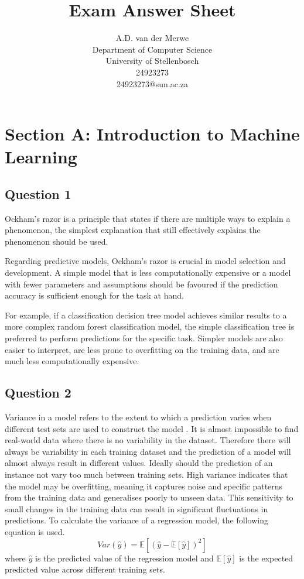 \documentclass[10pt]{article}
\title{Exam Answer Sheet}
\author{
    A.D. van der Merwe\\
    Department of Computer Science \\
    University of Stellenbosch\\
    24923273 \\
    24923273@sun.ac.za
}
\begin{document}
\maketitle

\section*{Section A: Introduction to Machine Learning}

\subsection*{Question 1}

Ockham's razor is a principle that states if there are multiple ways to explain
a phenomenon, the simplest explanation that still effectively explains the phenomenon
should be used.

Regarding predictive models, Ockham's razor is crucial in model selection and
development. A simple model that is less computationally expensive or a model with fewer
parameters and assumptions should be favoured if the prediction accuracy is sufficient enough
for the task at hand.

For example, if a classification decision tree model achieves similar results
to a more complex random forest classification model, the simple classification tree is preferred
to perform predictions for the specific task. Simpler models are also easier to interpret,
are less prone to overfitting on the training data, and are much less computationally expensive.

\subsection*{Question 2}

Variance in a model refers to the extent to which a prediction varies when
different test sets are used to construct the model \cite{ISLP}. It is almost impossible to find real-world data
where there is no variability in the dataset. Therefore there will always be variability in each training
dataset and the prediction of a model will almost always result in different values. Ideally
should the prediction of an instance not vary too much between training sets. High variance indicates that the
model may be overfitting, meaning it captures noise and specific patterns from the training data and
generalises poorly to unseen data. This sensitivity to small changes in the training data can result
in significant fluctuations in predictions. To calculate the variance of a regression model, the following equation is used.
\begin{equation}
    Var(\hat{y}) = \mathbb{E}\left[ \left( \hat{y} - \mathbb{E}\left[ \hat{y} \right] \right)^2 \right]
\end{equation}
where $\hat{y}$ is the predicted value of the regression model and $\mathbb{E}\left[ \hat{y} \right]$ is the
expected predicted value across different training sets.
\end{document}
